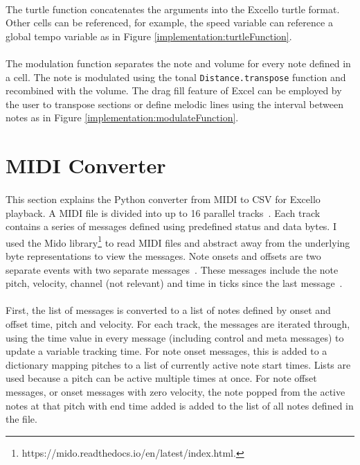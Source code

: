 \paragraph{} The turtle function concatenates the arguments into the Excello turtle format. Other cells can be referenced, for example, the speed variable can reference a global tempo variable as in Figure \ref{implementation:turtleFunction}.

\paragraph{} The modulation function separates the note and volume for every note defined in a cell. The note is modulated using the tonal \texttt{Distance.transpose} function and recombined with the volume. The drag fill feature of Excel can be employed by the user to transpose sections or define melodic lines using the interval between notes as in Figure \ref{implementation:modulateFunction}.

\section{MIDI Converter}

\paragraph{} This section explains the Python converter from MIDI to CSV for Excello playback. A MIDI file is divided into up to 16 parallel tracks~\cite{midiSpec}. Each track contains a series of messages defined using predefined status and data bytes. I used the Mido library\footnote{https://mido.readthedocs.io/en/latest/index.html.} to read MIDI files and abstract away from the underlying byte representations to view the messages. Note onsets and offsets are two separate events with two separate messages~\cite{midiSpec}. These messages include the note pitch, velocity, channel (not relevant) and time in ticks since the last message~\cite{midoSpec}.

\paragraph{} First, the list of messages is converted to a list of notes defined by onset and offset time, pitch and velocity. For each track, the messages are iterated through, using the time value in every message (including control and meta messages) to update a variable tracking time. For note onset messages, this is added to a dictionary mapping pitches to a list of currently active note start times. Lists are used because a pitch can be active multiple times at once. For note offset messages, or onset messages with zero velocity, the note popped from the active notes at that pitch with end time added is added to the list of all notes defined in the file.

